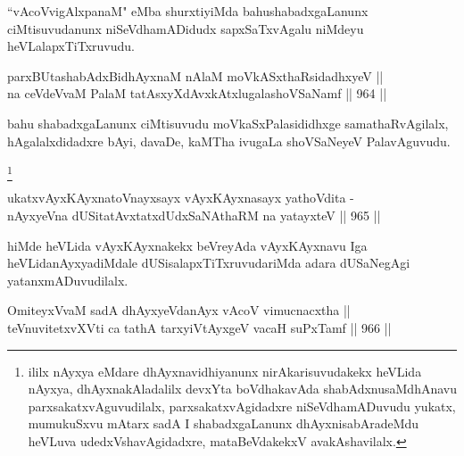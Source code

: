 \begin{artha}
``vAcoVvigAlxpanaM" eMba shurxtiyiMda bahushabadxgaLanunx ciMtisuvudanunx niSeVdhamADidudx sapxSaTxvAgalu niMdeyu heVLalapxTiTxruvudu.
\end{artha}


\begin{shl}
parxBUtashabAdxBidhAyxnaM nAlaM moVkASxthaRsidadhxyeV || \\
na ceVdeVvaM PalaM tatAsxyXdAvxkAtxlugalashoVSaNamf \hfill || 964 ||  
\end{shl}	

\begin{artha}
bahu shabadxgaLanunx ciMtisuvudu moVkaSxPalasididhxge samathaRvAgilalx, hAgalalxdidadxre bAyi, davaDe, kaMTha ivugaLa shoVSaNeyeV PalavAguvudu.
\end{artha}
\footnote{ililx nAyxya eMdare dhAyxnavidhiyanunx nirAkarisuvudakekx heVLida nAyxya, dhAyxnakAladalilx devxYta boVdhakavAda shabAdxnusaMdhAnavu parxsakatxvAguvudilalx, parxsakatxvAgidadxre niSeVdhamADuvudu yukatx, mumukuSxvu mAtarx sadA I shabadxgaLanunx dhAyxnisabAradeMdu heVLuva udedxVshavAgidadxre, mataBeVdakekxV avakAshavilalx.}

\begin{shl}
ukatxvAyxKAyxnatoV\s nayxsayx vAyxKAyxnasayx yathoVdita - \\
nAyxyeVna dUSitatAvxtatxdUdxSaNAthaRM na yatayxteV \hfill || 965 ||  
\end{shl}

\begin{artha}
hiMde heVLida vAyxKAyxnakekx beVreyAda vAyxKAyxnavu Iga heVLida\footnotemark[2] nAyxyadiMdale dUSisalapxTiTxruvudariMda adara dUSaNegAgi yatanxmADuvudilalx.
\end{artha}


\begin{shl}
\footnotemark[3]OmiteyxVvaM sadA dhAyxyeVdanAyx vAcoV vimucnacxtha || \\
teV\s nuvitetxvXVti ca tathA tarxyiVtAyxgeV vacaH suPxTamf \hfill || 966 ||  
\end{shl}

